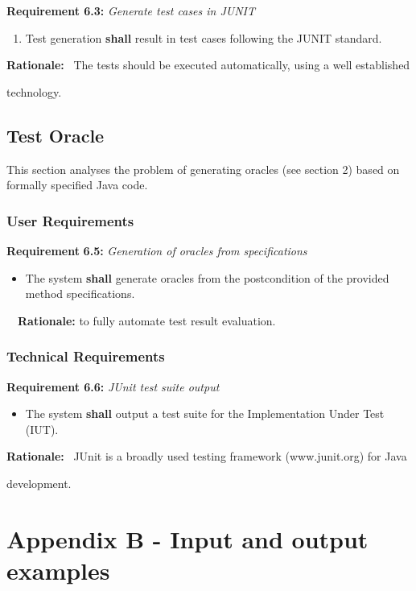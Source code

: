 \documentclass{article}
\newcommand{\tmem}[1]{{\em #1\/}}
\newcommand{\tmstrong}[1]{\textbf{#1}}
\newenvironment{enumeratealpha}{\begin{enumerate}[a{\textup{)}}] }{\end{enumerate}}
\newenvironment{itemizedot}{\begin{itemize} \renewcommand{\labelitemi}{$\bullet$}\renewcommand{\labelitemii}{$\bullet$}\renewcommand{\labelitemiii}{$\bullet$}\renewcommand{\labelitemiv}{$\bullet$}}{\end{itemize}}
\begin{document}
{\tmstrong{Requirement 6.3:}} {\tmem{Generate test cases in JUNIT}}
\begin{enumeratealpha}
  \item Test generation {\tmstrong{shall}} result in test cases following the
  JUNIT standard.
\end{enumeratealpha}


{\tmstrong{Rationale:}} \ The tests should be executed automatically, using a
well established

technology.

\subsection{Test Oracle}

This section analyses the problem of generating oracles (see section 2) based
on formally specified Java code.



\subsubsection{User Requirements}

{\tmstrong{Requirement}} {\tmstrong{6.5}}{\tmstrong{:}} {\tmem{Generation of
oracles from specifications}}
\begin{itemizedot}
  \item The system {\tmstrong{shall}} generate oracles from the postcondition
  of the provided method specifications.
\end{itemizedot}
\ \ {\tmstrong{Rationale:}} to fully automate test result evaluation. \



\subsubsection{Technical Requirements}

{\tmstrong{Requirement 6.6:}} {\tmem{JUnit test suite output}}
\begin{itemizedot}
  \item The system {\tmstrong{shall}} output a test suite for the
  Implementation Under Test (IUT).
\end{itemizedot}


{\tmstrong{Rationale:}} \ JUnit is a broadly used testing framework
(www.junit.org) for Java

development.

\section{Appendix B - Input and output examples}
\end{document}
